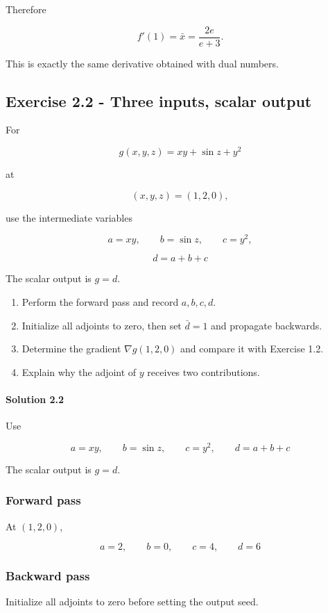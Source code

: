 \documentclass[10pt]{article}
\begin{document}
Therefore

\[
{
f'(1)=\bar x=\frac{2e}{e+3}
}.
\]

This is exactly the same derivative obtained with dual numbers.
\par\endgroup

\subsection*{Exercise 2.2 - Three inputs, scalar output}
For

\[
g(x,y,z)=xy+\sin z+y^2
\]

at

\[
(x,y,z)=(1,2,0),
\]

use the intermediate variables

\[
a=xy,
\qquad
b=\sin z,
\qquad
c=y^2,
\]

\[
d=a+b+c
\]

The scalar output is $g=d$.

\begin{enumerate}
\item
Perform the forward pass and record $a,b,c,d$.

\item
Initialize all adjoints to zero, then set $\bar d=1$ and propagate backwards.

\item
Determine the gradient $\nabla g(1,2,0)$ and compare it with Exercise 1.2.

\item
Explain why the adjoint of $y$ receives two contributions.

\end{enumerate}

\begingroup\color{red}
\paragraph*{Solution 2.2}
Use

\[
a=xy,
\qquad
b=\sin z,
\qquad
c=y^2,
\qquad
d=a+b+c
\]

The scalar output is $g=d$.

\subsubsection*{Forward pass}
At $(1,2,0)$,

\[
a=2,
\qquad
b=0,
\qquad
c=4,
\qquad
d=6
\]

\subsubsection*{Backward pass}
Initialize all adjoints to zero before setting the output seed.
\end{document}
